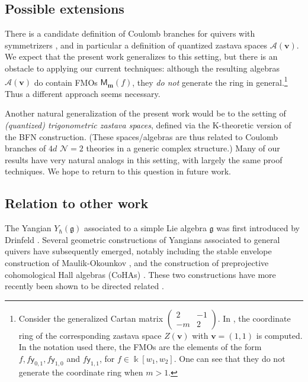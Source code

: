 \documentclass[11pt,reqno]{amsart}
\renewcommand{\mathbf}{\mathbold}
\numberwithin{equation}{section}
\theoremstyle{definition}
\newcommand{\cA}{\mathcal{A}}
\newcommand{\cN}{\mathcal{N}}
\newcommand{\fg}{\mathfrak{g}}
\newcommand{\bm}{\mathbf{m}}
\newcommand{\bv}{\mathbf{v}}
\newcommand{\kk}{\Bbbk}
\renewcommand{\bv}{\mathbf{v}} %
\newcommand{\M}{\mathsf{M}}
\newcommand{\qzast}{\cA}
\begin{document}
\subsection{Possible extensions}
There is a candidate definition of Coulomb branches for quivers with symmetrizers \cite{NW}, and in particular a definition of quantized zastava spaces $\qzast(\bv)$.  We expect that the present work generalizes to this setting, but there is an obstacle to applying our current techniques: although the resulting algebras $\qzast(\bv)$ do contain FMOs $\M_\bm(f)$, they \emph{do not} generate the ring in general.\footnote{Consider the generalized Cartan matrix $\begin{pmatrix} 2 & -1 \\ -m & 2 \end{pmatrix}$. In  \cite[\S 3(ii)]{NW}, the coordinate ring of the corresponding zastava space $Z(\bv)$ with $\bv = (1,1)$ is computed. In the notation used there, the FMOs are the elements of the form $f, f\mathsf{y}_{0,1}, f\mathsf{y}_{1,0}$ and $ f \mathsf{y}_{1,1}$, for $f \in \kk[w_1,w_2]$. One can see that they do not generate the coordinate ring when $m >1$.}
Thus a different approach seems necessary.


Another natural generalization of the present work would be to the setting of \emph{(quantized) trigonometric zastava spaces}, defined via the K-theoretic version of the BFN construction. (These spaces/algebras are thus related to Coulomb branches of $4d $ $\cN=2$ theories in a generic complex structure.) Many of our results have very natural  analogs in this setting, with largely the same proof techniques.  We hope to return to this question in future work.


\subsection{Relation to other work}

The Yangian $Y_\hbar(\fg)$ associated to a simple Lie algebra $\fg$ was first introduced by Drinfeld \cite{Drinfeld1}. Several geometric constructions of Yangians associated to general quivers have subsequently emerged, notably including the stable envelope construction of Maulik-Okounkov \cite{Maulik-Okounkov}, and the construction of preprojective cohomological Hall algebras (CoHAs) \cite{KS,SV1,SV2,SV3,YangZhao}. These two constructions have more recently been shown to be directed related \cite{BD,SV4}.
\end{document}

